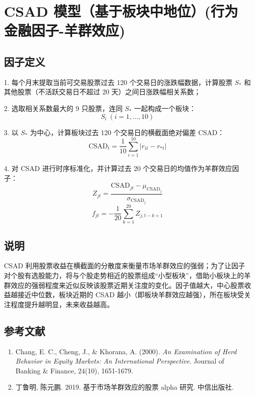 \documentclass{article}
\begin{document}
\section{CSAD 模型（基于板块中地位）(行为金融因子-羊群效应)}

\subsection{因子定义}

1. 每个月末提取当前可交易股票过去 120 个交易日的涨跌幅数据，计算股票 \( S_* \) 和其他股票（不活跃交易日不超过 20 天）之间日涨跌幅相关系数；

2. 选取相关系数最大的 9 只股票，连同 \( S_* \) 一起构成一个板块：
   \begin{equation}
       S_i \ (i = 1, \dots, 10)
   \end{equation}

3. 以 \( S_* \) 为中心，计算板块过去 120 个交易日的横截面绝对偏差 \( \mathrm{CSAD} \)：
   \begin{equation}
       \mathrm{CSAD}_t = \frac{1}{10} \sum_{i=1}^{10} |r_{it} - r_{*t}|
   \end{equation}

4. 对 CSAD 进行时序标准化，并计算过去 20 个交易日的均值作为羊群效应因子：
   \begin{equation}
       Z_{jt} = \frac{\mathrm{CSAD}_{jt} - \mu_{\mathrm{CSAD}_j}}{\sigma_{\mathrm{CSAD}_j}}
   \end{equation}
   \begin{equation}
       f_{jt} = -\frac{1}{20} \sum_{k=1}^{20} Z_{j,t-k+1}
   \end{equation}

\subsection{说明}
CSAD 利用股票收益在横截面的分散度来衡量市场羊群效应的强弱；为了让因子对个股有选股能力，将与个股走势相近的股票组成“小型板块”，借助小板块上的羊群效应的强弱程度来近似反映该股票近期关注度的变化。因子值越大，中心股票收益越接近中位数，板块近期的 CSAD 越小（即板块羊群效应越强），所在板块受关注程度提升越明显，未来收益越高。

\subsection{参考文献}
\begin{enumerate}
    \item Chang, E. C., Cheng, J., \& Khorana, A. (2000). \textit{An Examination of Herd Behavior in Equity Markets: An International Perspective}. Journal of Banking \& Finance, 24(10), 1651-1679.
    \item 丁鲁明, 陈元鹏. 2019. 基于市场羊群效应的股票 alpha 研究. 中信出版社.
\end{enumerate}
\end{document}
